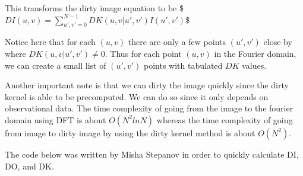 \documentclass[letterpaper,10pt,english]{jupyterBook}
\begin{document}
\sphinxAtStartPar
This transforms the dirty image equation to be \$\(DI(u,v) = \sum^{N-1}_{u',v' = 0} DK(u,v|u',v') I(u',v')\)\$

\sphinxAtStartPar
Notice here that for each \((u,v)\) there are only a few points \((u',v')\) close by where \(DK(u,v|u',v') \neq 0\). Thus for each point \((u,v)\) in the Fourier domain, we can create a small list of \((u',v')\) points with tabulated \(DK\) values.

\sphinxAtStartPar
Another important note is that we can dirty the image quickly since the dirty kernel is able to be precomputed. We can do so since it only depends on observational data. The time complexity of going from the image to the fourier domain using DFT is about \(O(N^2lnN)\) whereas the time complexity of going from image to dirty image by using the dirty kernel method is about \(O(N^2)\).

\sphinxAtStartPar
The code below was written by Misha Stepanov in order to quickly calculate DI, DO, and DK.
\end{document}
